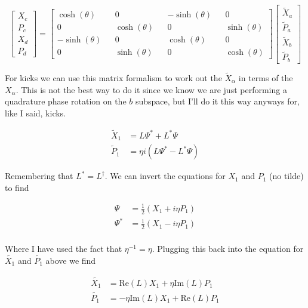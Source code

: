 \documentclass[12pt]{article}
\begin{document}
\begin{equation}
\begin{bmatrix}
X_c\\P_c\\X_d\\P_d
\end{bmatrix}
=
\begin{bmatrix}
\cosh(\theta) && 0 && -\sinh(\theta) && 0\\
0 && \cosh(\theta) && 0 && \sinh(\theta)\\
-\sinh(\theta) && 0 && \cosh(\theta) && 0\\
0 && \sinh(\theta) && 0 && \cosh(\theta)
\end{bmatrix}
\begin{bmatrix}
\tilde{X}_a\\\tilde{P}_a\\\tilde{X}_b\\\tilde{P}_b
\end{bmatrix}
\end{equation}

For kicks we can use this matrix formalism to work out the $\tilde{X}_{\alpha}$ in terms of the $X_{\alpha}$. This is not the best way to do it since we know we are just performing a quadrature phase rotation on the $b$ subspace, but I'll do it this way anyways for, like I said, kicks.

\begin{align*}
\tilde{X}_1 &= L \Psi^* + L^*\Psi\\
\tilde{P}_1 &= \eta i(L\Psi^* - L^*\Psi)
\end{align*}

Remembering that $L^*=L^{\dag}$. We can invert the equations for $X_1$ and $P_1$ (no tilde) to find

\begin{align*}
\Psi &= \frac{1}{2}(X_1 + i \eta P_1)\\
\Psi^* &= \frac{1}{2}(X_1 - i \eta P_1)\\
\end{align*}

Where I have used the fact that $\eta^{-1}=\eta$. Plugging this back into the equation for $\tilde{X_1}$ and $\tilde{P_1}$ above we find

\begin{align*}
\tilde{X_1} &= \text{Re}(L)X_1 +\eta\text{Im}(L)P_1\\
\tilde{P_1} &= -\eta\text{Im}(L)X_1 + \text{Re}(L)P_1
\end{align*}
\end{document}
